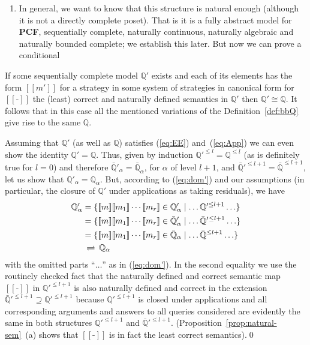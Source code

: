 \documentclass[fleqn]{LMCS}
\theoremstyle{plain}\newtheorem{satz}[thm]{Satz}
\theoremstyle{plain}\newtheorem{hyp}[thm]{Hypothesis}
\theoremstyle{plain}\newtheorem{hyps}[thm]{Hypotheses}
\theoremstyle{definition}\newtheorem{note}[thm]{Note}
\newcommand{\defis}{\mbox{-}}
\newcommand{\bYdef}{\mathrel{\BYDEF}}
\newcommand{\BYDEF}{\mbox{$\hspace{.2em}\rightleftharpoons\hspace{.2em}$}}
\newcommand{\Dsem}[1]{[\![ #1 ]\!]}
\newcommand{\bbQ}{\mathbb{Q}}
\newcommand{\PCF}{\mbox{\bf PCF}}
\newcommand{\?}{\mbox{?}}
\begin{document}
\begin{enumerate}[(1)]
\item
In general, we want to know that this structure is natural enough 
(although it is not a directly complete poset). 
That is it is a fully abstract model for \PCF, sequentially complete, 
naturally continuous, naturally algebraic and 
naturally bounded complete; we establish this later.  
But now we can prove a conditional 

\end{enumerate}














\begin{prop}\label{prop:conditional-isomorphism}
If some 
sequentially complete model $\bbQ'$ exists 
and each of its elements has the form 
$\Dsem{m'}$ for a strategy in some system of strategies 
in canonical form for $\Dsem{\defis}$ the (least) correct and naturally defined 
semantics in $\bbQ'$ then $\bbQ'\cong\bbQ$. 
It follows that in this case all the mentioned variations of the Definition~\ref{def:bbQ} 
give rise to the same $\bbQ$. 
\end{prop}
\proof 
Assuming 
that $\bbQ'$ (as well as $\bbQ$) satisfies 
(\ref{eq:EE}) and~(\ref{eq:App}) we can even show the identity $\bbQ'=\bbQ$. 
Thus, given by induction $\bbQ'^{\le l}=\bbQ^{\le l}$ 
(as is definitely true for $l=0$) 
and therefore 
$\bar{\bbQ}'_\alpha=\bar{\bbQ}_\alpha$, 
for $\alpha$ of level $l+1$, 
and $\bar{\bbQ}'^{\le l+1}=\bar{\bbQ}^{\le l+1}$, 
let us show that $\bbQ'_\alpha=\bbQ_\alpha$. 
But, according to (\ref{eq:dom'}) and our assumptions (in particular, the closure of 
$\bbQ'$ under applications as taking residuals), we have 
\begin{align*}
\bbQ'_\alpha & = 
\{\Dsem{m}\Dsem{m_1}\cdots\Dsem{m_r}\in\bbQ'_{\alpha}
\mid\ldots\bbQ'^{\le l+1}\ldots\} 
\\
 & = 
 \{\Dsem{m}\Dsem{m_1}\cdots\Dsem{m_r}\in\bar{\bbQ}'_{\alpha}
\mid\ldots\bar{\bbQ}'{}^{\le l+1}\ldots\} 
\\
 & = 
 \{\Dsem{m}\Dsem{m_1}\cdots\Dsem{m_r}\in\bar{\bbQ}_{\alpha}
\mid\ldots\bar{\bbQ}{}^{\le l+1}\ldots\} 
\\
 & \bYdef 
 \bbQ_{\alpha}
\end{align*} 
with the omitted parts ``$\ldots$'' as in (\ref{eq:dom'}).
In the second equality we use 
the routinely checked fact that the naturally defined and correct semantic map 
$\Dsem{\defis}$ in $\bbQ'^{\le l+1}$ is also naturally defined and correct in the extension 
$\bar{\bbQ}'^{\le l+1}\supseteq\bbQ'^{\le l+1}$ because $\bbQ'^{\le l+1}$ is closed 
under applications and all corresponding arguments and answers to all 
queries considered are evidently the same in both structures 
$\bbQ'^{\le l+1}$ and $\bar{\bbQ}'^{\le l+1}$. 
(Proposition~\ref{prop:natural-sem}~(a) shows that $\Dsem{\defis}$ is in fact the least 
correct semantics).\qed
\end{document}
